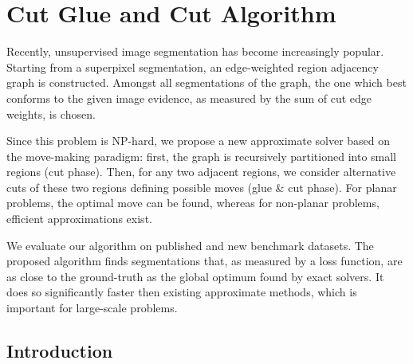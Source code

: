 \flushleft
\chapter{Cut Glue and Cut Algorithm}\label{ch:cgc} 





Recently, unsupervised image segmentation has become increasingly popular.
Starting from a superpixel segmentation, an edge-weighted region adjacency graph is constructed. 
Amongst all segmentations of the graph, the one which best conforms to the given image
evidence, as measured by the sum of cut edge weights, is chosen.

Since this problem is NP-hard, we propose  a new approximate solver based on the move-making paradigm:
first, the graph is recursively partitioned into small regions (cut phase).
%
Then, for any two adjacent 
regions, we consider alternative cuts of these two regions
defining possible moves (glue \& cut phase).
%
For planar problems, the optimal move can be found, whereas
for non-planar problems, efficient approximations exist. 

We evaluate our algorithm on published and
new benchmark datasets.
%
The proposed algorithm finds segmentations that,
as measured by a loss function, are as close to
the ground-truth as the global optimum found by exact solvers.
%
It does so significantly faster then existing approximate methods,
which is important for large-scale problems.








\section{Introduction}


